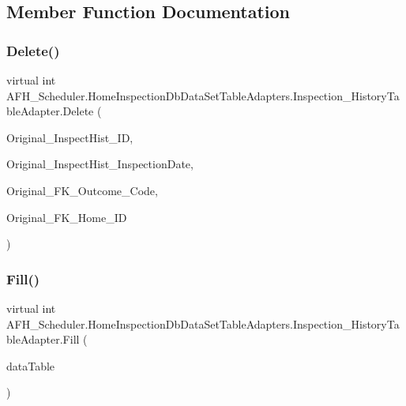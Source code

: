 \subsection{Member Function Documentation}
\mbox{\label{class_a_f_h___scheduler_1_1_home_inspection_db_data_set_table_adapters_1_1_inspection___history_table_adapter_a784b8728226f2e643f8e82dc1f0173fa}} 
\subsubsection{Delete()}
{\footnotesize\ttfamily virtual int A\+F\+H\+\_\+\+Scheduler.\+Home\+Inspection\+Db\+Data\+Set\+Table\+Adapters.\+Inspection\+\_\+\+History\+Table\+Adapter.\+Delete (\begin{DoxyParamCaption}\item[{int}]{Original\+\_\+\+Inspect\+Hist\+\_\+\+ID,  }\item[{global\+::\+System.\+Nullable$<$ global\+::\+System.\+Date\+Time $>$}]{Original\+\_\+\+Inspect\+Hist\+\_\+\+Inspection\+Date,  }\item[{string}]{Original\+\_\+\+F\+K\+\_\+\+Outcome\+\_\+\+Code,  }\item[{string}]{Original\+\_\+\+F\+K\+\_\+\+Home\+\_\+\+ID }\end{DoxyParamCaption})\hspace{0.3cm}{\ttfamily [virtual]}}

\mbox{\label{class_a_f_h___scheduler_1_1_home_inspection_db_data_set_table_adapters_1_1_inspection___history_table_adapter_ae164a14326a06fc6a74505bdb33f74b2}} 
\subsubsection{Fill()}
{\footnotesize\ttfamily virtual int A\+F\+H\+\_\+\+Scheduler.\+Home\+Inspection\+Db\+Data\+Set\+Table\+Adapters.\+Inspection\+\_\+\+History\+Table\+Adapter.\+Fill (\begin{DoxyParamCaption}\item[{\textbf{ Home\+Inspection\+Db\+Data\+Set.\+Inspection\+\_\+\+History\+Data\+Table}}]{data\+Table }\end{DoxyParamCaption})\hspace{0.3cm}{\ttfamily [virtual]}}

